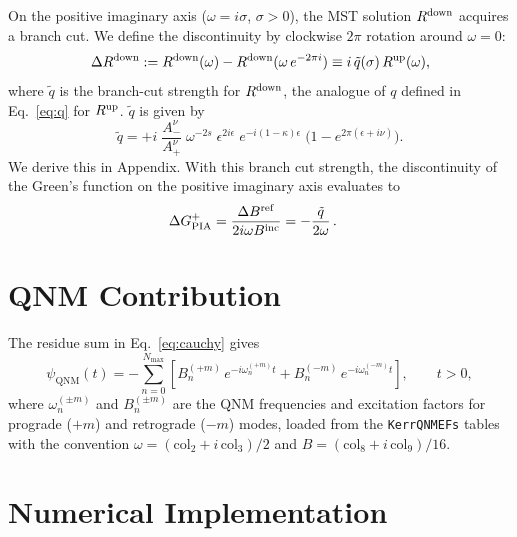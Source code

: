 \documentclass[12pt,a4paper]{article}
\newcommand{\psiQNM}{\psi_{\mathrm{QNM}}}
\begin{document}
On the positive imaginary axis ($\omega = i\sigma$, $\sigma > 0$),
the MST solution $R^{\rm down}$ acquires a branch cut.
We define the discontinuity by clockwise $2\pi$ rotation around
$\omega=0$:
\begin{equation}
  \Delta R^{\rm down}
  := R^{\rm down}(\omega) - R^{\rm down}(\omega\,e^{-2\pi i})
  \equiv i\,\tilde{q}(\sigma)\,R^{\rm up}(\omega),
  \label{eq:deltaRdown}
\end{equation}
where $\tilde{q}$ is the branch-cut strength for $R^{\rm down}$,
the analogue of $q$ defined in Eq.~\eqref{eq:q} for $R^{\rm up}$. $\tilde{q}$ is given by
\begin{equation}
    \tilde{q} = +i\;\frac{A^\nu_-}{A^\nu_+}\;\omega^{-2s}\;
    \epsilon^{2i\epsilon}\;e^{-i(1-\kappa)\epsilon}\;
    \bigl(1 - e^{2\pi(\epsilon + i\nu)}\bigr).
  \label{eq:qtilde}
\end{equation}
We derive this in Appendix. With this branch cut strength, the discontinuity of the Green's function on the positive imaginary axis evaluates to
\begin{align}
  \Delta G^+_{\rm PIA} &= \frac{\Delta B^{\rm ref}}{2i\omega B^{\rm inc}}=-\frac{\tilde{q}}{2\omega}\,.
\end{align}


\section{QNM Contribution}

The residue sum in Eq.~\eqref{eq:cauchy} gives
\begin{equation}
  \psiQNM(t) = -\sum_{n=0}^{N_{\max}} \left[
    B_n^{(+m)}\,e^{-i\omega_n^{(+m)} t}
    + B_n^{(-m)}\,e^{-i\omega_n^{(-m)} t}
  \right], \qquad t > 0,
  \label{eq:QNM}
\end{equation}
where $\omega_n^{(\pm m)}$ and $B_n^{(\pm m)}$ are the QNM frequencies
and excitation factors for prograde ($+m$) and retrograde ($-m$) modes,
loaded from the \texttt{KerrQNMEFs} tables with the convention
$\omega = (\text{col}_2 + i\,\text{col}_3)/2$ and
$B = (\text{col}_8 + i\,\text{col}_9)/16$.

\section{Numerical Implementation}
\end{document}
